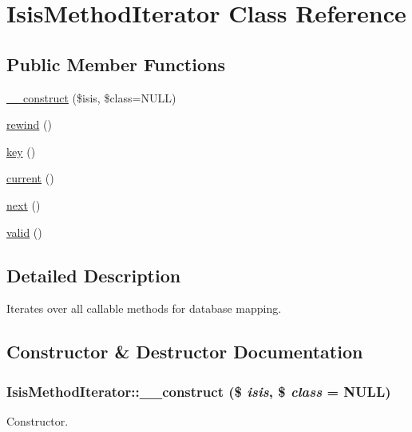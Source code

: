 \hypertarget{classIsisMethodIterator}{
\section{IsisMethodIterator Class Reference}
\label{classIsisMethodIterator}
}
\subsection*{Public Member Functions}
\begin{DoxyCompactItemize}
\item 
\hyperlink{classIsisMethodIterator_a63918446ce5cb16c55166a23dcf6ac0f}{\_\-\_\-construct} (\$isis, \$class=NULL)
\item 
\hyperlink{classIsisMethodIterator_a1a0ee1617a50e6aa57fe80cd0c2023df}{rewind} ()
\item 
\hyperlink{classIsisMethodIterator_ad750f5dd57dcb6480f64f9ac703492fc}{key} ()
\item 
\hyperlink{classIsisMethodIterator_a1d7236d349cd282c4c0ff6ec8f186e93}{current} ()
\item 
\hyperlink{classIsisMethodIterator_a8a02e17d6597ba1f199bd82ab9fc1b32}{next} ()
\item 
\hyperlink{classIsisMethodIterator_acb2ac4c3a336d9c6c25d97bd47f60759}{valid} ()
\end{DoxyCompactItemize}


\subsection{Detailed Description}
Iterates over all callable methods for database mapping. 

\subsection{Constructor \& Destructor Documentation}
\hypertarget{classIsisMethodIterator_a63918446ce5cb16c55166a23dcf6ac0f}{
\subsubsection[{\_\-\_\-construct}]{\setlength{\rightskip}{0pt plus 5cm}IsisMethodIterator::\_\-\_\-construct (\$ {\em isis}, \/  \$ {\em class} = {\ttfamily NULL})}}
\label{classIsisMethodIterator_a63918446ce5cb16c55166a23dcf6ac0f}
Constructor.


